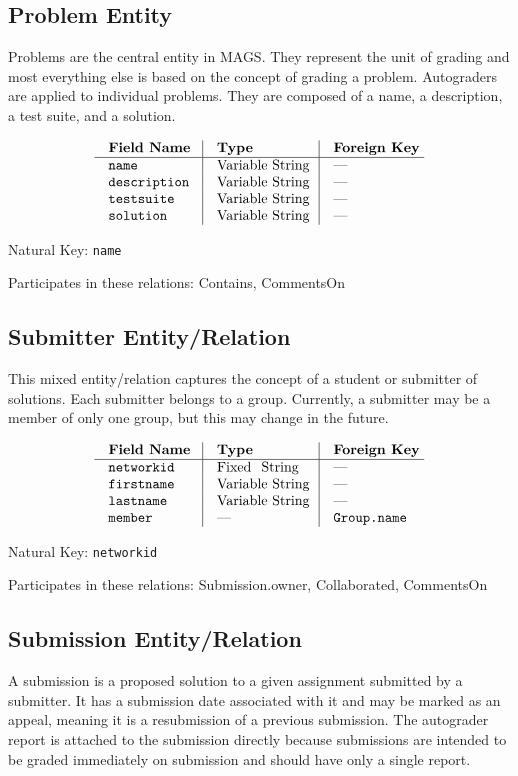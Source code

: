 \subsection{Problem Entity}
Problems are the central entity in MAGS. 
They represent the unit of grading and most everything else is based on 
the concept of grading a problem.
Autograders are applied to individual problems. 
They are composed of a name, a description, a test suite, and a solution.

$$\vbox{
	\offinterlineskip
	\halign{
		\strut \quad {\tt #}	& \vrule\quad #	& \vrule\quad # \cr
		{\bf Field Name}	& {\bf Type}	& {\bf Foreign Key}\cr
		\noalign{\hrule}		
		name	& Variable String	& --- \cr
		description	& Variable String	& --- \cr
		testsuite	& Variable String	& --- \cr
		solution	& Variable String & --- \cr
	}
}$$

{\noindent
Natural Key: {\tt name}\par\noindent
Participates in these relations: Contains, CommentsOn\par}

\subsection{Submitter Entity/Relation}
This mixed entity/relation captures the concept
of a student or submitter of solutions.
Each submitter belongs to a group.
Currently, a submitter may be a member of only one group,
but this may change in the future.

$$\vbox{
	\offinterlineskip
	\halign{
		\strut \quad {\tt #}	& \vrule\quad #	& \vrule\quad # \cr
		{\bf Field Name}	& {\bf Type}	& {\bf Foreign Key}\cr
		\noalign{\hrule}		
		networkid	& Fixed String	& --- \cr
		firstname	& Variable String	& --- \cr
		lastname	& Variable String	& --- \cr
		member	& ---	& {\tt Group.name} \cr
	}
}$$

{\noindent
Natural Key: {\tt networkid}\par\noindent
Participates in these relations: Submission.owner, Collaborated, CommentsOn \par}

\subsection{Submission Entity/Relation}
A submission is a proposed solution to a given assignment
submitted by a submitter. It has a submission date associated with 
it and may be marked as an appeal, meaning it is a resubmission
of a previous submission.
The autograder report is attached to the submission directly 
because submissions are intended to be graded immediately on submission
and should have only a single report.

